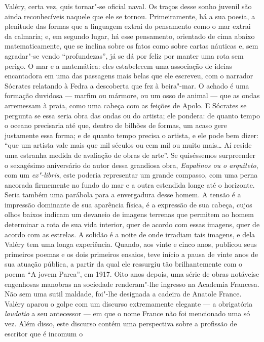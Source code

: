 \noindent{}Valéry, certa vez, quis tornar"-se oficial naval. Os traços desse sonho
juvenil são ainda reconhecíveis naquele que ele se tornou.
Primeiramente, há a sua poesia, a plenitude das formas que a linguagem
extrai do pensamento como o mar extrai da calmaria; e, em segundo lugar,
há esse pensamento, orientado de cima abaixo matematicamente, que se
inclina sobre os fatos como sobre cartas náuticas e, sem agradar"-se
vendo ``profundezas'', já se dá por feliz por manter uma rota sem
perigo. O mar e a matemática: eles estabelecem uma associação de ideias
encantadora em uma das passagens mais belas que ele escreveu, com o
narrador Sócrates relatando à Fedra a descoberta que fez à beira"-mar. O
achado é uma formação duvidosa --- marfim ou mármore, ou um osso de animal
--- que as ondas arremessam à praia, como uma cabeça com as feições de Apolo.
E Sócrates se pergunta se essa seria obra das ondas ou do
artista; ele pondera: de quanto tempo o oceano precisaria
até que, dentro de bilhões de formas, um acaso gere justamente essa
forma; e de quanto tempo precisa o artista, e ele pode bem dizer: ``que um
artista vale mais que mil séculos ou cem mil ou muito mais\ldots{} Aí
reside uma estranha medida de avaliação de obras de arte''. Se
quiséssemos surpreender o sexagésimo
aniversário do autor dessa grandiosa obra, \emph{Eupalinos ou o arquiteto},
com um \emph{ex"-libris}, este poderia representar um grande compasso, com uma perna ancorada firmemente no
fundo do mar e a outra estendida longe até o horizonte. Seria também uma
parábola para a envergadura desse homem. A tensão é a impressão
dominante de sua aparência física, é a expressão de sua cabeça, cujos
olhos baixos indicam um devaneio de imagens terrenas que permitem ao
homem determinar a rota de sua vida interior, quer de acordo com essas
imagens, quer de acordo com as estrelas. A solidão é a noite de onde
irradiam tais imagens, e dela Valéry tem uma longa experiência. Quando,
aos vinte e cinco anos, publicou seus primeiros poemas e os dois
primeiros ensaios, teve início a pausa de vinte anos de sua atuação
pública, a partir da qual ele ressurgiu tão brilhantemente com o poema
``A jovem Parca'', em 1917. Oito anos depois, uma série de obras notáveis
​​e engenhosas manobras na sociedade renderam"-lhe ingresso na Academia
Francesa. Não sem uma sutil maldade, foi"-lhe designada a cadeira de
Anatole France. Valéry aparou o golpe com um discurso extremamente
elegante --- a obrigatória \emph{laudatio} a seu antecessor --- em que o
nome France não foi mencionado uma só vez. Além disso, este discurso
contém uma perspectiva sobre a profissão de escritor que é incomum o
